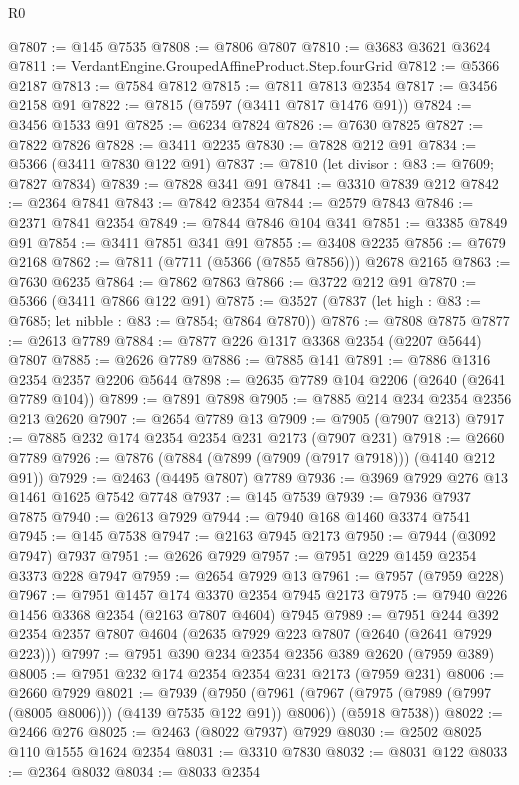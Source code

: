 \begin{lexlean}{R0}
\begin{coremodule}
@7807 := @145 @7535
@7808 := @7806 @7807
@7810 := @3683 @3621 @3624
@7811 := VerdantEngine.GroupedAffineProduct.Step.fourGrid
@7812 := @5366 @2187
@7813 := @7584 @7812
@7815 := @7811 @7813 @2354
@7817 := @3456 @2158 @91
@7822 := @7815 (@7597 (@3411 @7817 @1476 @91))
@7824 := @3456 @1533 @91
@7825 := @6234 @7824
@7826 := @7630 @7825
@7827 := @7822 @7826
@7828 := @3411 @2235
@7830 := @7828 @212 @91
@7834 := @5366 (@3411 @7830 @122 @91)
@7837 := @7810 (let divisor : @83 := @7609; @7827 @7834)
@7839 := @7828 @341 @91
@7841 := @3310 @7839 @212
@7842 := @2364 @7841
@7843 := @7842 @2354
@7844 := @2579 @7843
@7846 := @2371 @7841 @2354
@7849 := @7844 @7846 @104 @341
@7851 := @3385 @7849 @91
@7854 := @3411 @7851 @341 @91
@7855 := @3408 @2235
@7856 := @7679 @2168
@7862 := @7811 (@7711 (@5366 (@7855 @7856))) @2678 @2165
@7863 := @7630 @6235
@7864 := @7862 @7863
@7866 := @3722 @212 @91
@7870 := @5366 (@3411 @7866 @122 @91)
@7875 := @3527 (@7837 (let high : @83 := @7685; let nibble : @83 := @7854; @7864 @7870))
@7876 := @7808 @7875
@7877 := @2613 @7789
@7884 := @7877 @226 @1317 @3368 @2354 (@2207 @5644) @7807
@7885 := @2626 @7789
@7886 := @7885 @141
@7891 := @7886 @1316 @2354 @2357 @2206 @5644
@7898 := @2635 @7789 @104 @2206 (@2640 (@2641 @7789 @104))
@7899 := @7891 @7898
@7905 := @7885 @214 @234 @2354 @2356 @213 @2620
@7907 := @2654 @7789 @13
@7909 := @7905 (@7907 @213)
@7917 := @7885 @232 @174 @2354 @2354 @231 @2173 (@7907 @231)
@7918 := @2660 @7789
@7926 := @7876 (@7884 (@7899 (@7909 (@7917 @7918))) (@4140 @212 @91))
@7929 := @2463 (@4495 @7807) @7789
@7936 := @3969 @7929 @276 @13 @1461 @1625 @7542 @7748
@7937 := @145 @7539
@7939 := @7936 @7937 @7875
@7940 := @2613 @7929
@7944 := @7940 @168 @1460 @3374 @7541
@7945 := @145 @7538
@7947 := @2163 @7945 @2173
@7950 := @7944 (@3092 @7947) @7937
@7951 := @2626 @7929
@7957 := @7951 @229 @1459 @2354 @3373 @228 @7947
@7959 := @2654 @7929 @13
@7961 := @7957 (@7959 @228)
@7967 := @7951 @1457 @174 @3370 @2354 @7945 @2173
@7975 := @7940 @226 @1456 @3368 @2354 (@2163 @7807 @4604) @7945
@7989 := @7951 @244 @392 @2354 @2357 @7807 @4604 (@2635 @7929 @223 @7807 (@2640 (@2641 @7929 @223)))
@7997 := @7951 @390 @234 @2354 @2356 @389 @2620 (@7959 @389)
@8005 := @7951 @232 @174 @2354 @2354 @231 @2173 (@7959 @231)
@8006 := @2660 @7929
@8021 := @7939
    (@7950
      (@7961 (@7967 (@7975 (@7989 (@7997 (@8005 @8006))) (@4139 @7535 @122 @91)) @8006))
      (@5918 @7538))
@8022 := @2466 @276
@8025 := @2463 (@8022 @7937) @7929
@8030 := @2502 @8025 @110 @1555 @1624 @2354
@8031 := @3310 @7830
@8032 := @8031 @122
@8033 := @2364 @8032
@8034 := @8033 @2354

\end{coremodule}
\end{lexlean}
